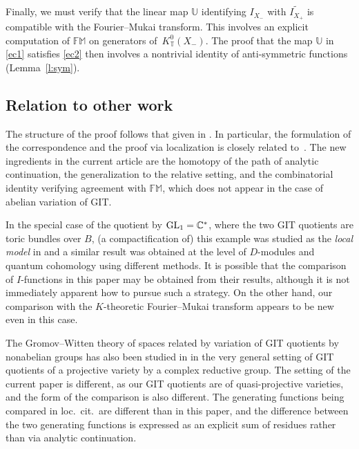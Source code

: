 \documentclass[pdftex]{sigma}
\numberwithin{equation}{section}
\newcommand{\CC}{\mathbb{C}}
\newcommand{\UU}{\mathbb{U}}
\newcommand{\torus}{\mathbb{T}}
\newcommand{\FM}{\mathbb{FM}}
\begin{document}
Finally, we must verify that the linear map $\UU$ identifying $I_{X_{-}}$ with $\widetilde{I_{X_{+}}}$ is compatible with the Fourier--Mukai transform. This involves an explicit computation of $\FM$ on generators of~$K^0_\torus(X_-)$. The proof that the map $\UU$ in \eqref{ec1} satisfies \eqref{ec2} then involves a nontrivial identity of anti-symmetric functions (Lemma~\ref{l:sym}).

\subsection{Relation to other work}\label{ss:otherwork}

The structure of the proof follows that given in \cite{ChIR,ChR, CIJ, CIT}. In particular, the formulation of the correspondence and the proof via localization is closely related to~\cite{CIJ}. The new ingredients in the current article are the homotopy of the path of analytic continuation, the generalization to the relative setting, and the combinatorial identity verifying agreement with $\FM$, which does not appear in the case of abelian variation of GIT.

In the special case of the quotient by ${\rm GL}_1 = \CC^*$, where the two GIT quotients are toric bundles over $B$, (a compactification of) this example was studied as the \emph{local model} in \cite{LLW2} and a similar result was obtained at the level of $D$-modules and quantum cohomology using different methods. It is possible that the comparison of $I$-functions in this paper may be obtained from their results, although it is not immediately apparent how to pursue such a strategy. On the other hand, our comparison with the $K$-theoretic Fourier--Mukai transform appears to be new even in this case.

The Gromov--Witten theory of spaces related by variation of GIT quotients by nonabelian groups has also been studied in \cite{GW} in the very general setting of GIT quotients of a projective variety by a complex reductive group. The setting of the current paper is different, as our GIT quotients are of quasi-projective varieties, and the form of the comparison is also different.
The generating functions being compared in loc.~cit.\ are different than in this paper, and the difference between the two generating functions is expressed as an explicit sum of residues rather than via analytic continuation.
\end{document}
